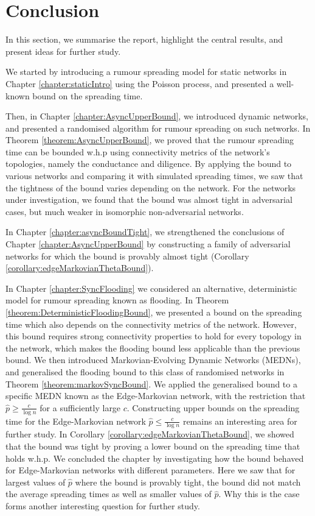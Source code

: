 \chapter{Conclusion}\label{chapter:conclusion}

In this section, we summarise the report, highlight the central results, and present ideas for further study.

We started by introducing a rumour spreading model for static networks in Chapter \ref{chapter:staticIntro} using the Poisson process, and presented a well-known bound on the spreading time. 

Then, in Chapter \ref{chapter:AsyncUpperBound}, we introduced dynamic networks, and presented a randomised algorithm for rumour spreading on such networks. In Theorem \ref{theorem:AsyncUpperBound}, we proved that the rumour spreading time can be bounded w.h.p using connectivity metrics of the network's topologies, namely the conductance and diligence. By applying the bound to various networks and comparing it with simulated spreading times, we saw that the tightness of the bound varies depending on the network. For the networks under investigation, we found that the bound was almost tight in adversarial cases, but much weaker in isomorphic non-adversarial networks. 

In Chapter \ref{chapter:asyncBoundTight}, we strengthened the conclusions of Chapter \ref{chapter:AsyncUpperBound} by constructing a family of adversarial networks for which the bound is provably almost tight (Corollary \ref{corollary:edgeMarkovianThetaBound}).

In Chapter \ref{chapter:SyncFlooding} we considered an alternative, deterministic model for rumour spreading known as flooding. In Theorem \ref{theorem:DeterministicFloodingBound}, we presented a bound on the spreading time which also depends on the connectivity metrics of the network. 
However, this bound requires strong connectivity properties to hold for every topology in the network, which makes the flooding bound less applicable than the previous bound. %
We then introduced Markovian-Evolving Dynamic Networks (MEDNs), and generalised the flooding bound to this class of randomised networks in Theorem \ref{theorem:markovSyncBound}. We applied the generalised bound to a specific MEDN known as the Edge-Markovian network, with the restriction that $\hat{p} \geq \frac{c}{\log n}$ for a sufficiently large $c$. Constructing upper bounds on the spreading time for the Edge-Markovian network $\hat{p} \leq \frac{c}{\log n}$ remains an interesting area for further study. In Corollary \ref{corollary:edgeMarkovianThetaBound}, we showed that the bound was tight by proving a lower bound on the spreading time that holds w.h.p. We concluded the chapter by investigating how the bound behaved for Edge-Markovian networks with different parameters. Here we saw that for largest values of $\hat{p}$ where the bound is provably tight, the bound did not match the average spreading times as well as smaller values of $\hat{p}$. Why this is the case forms another interesting question for further study.
